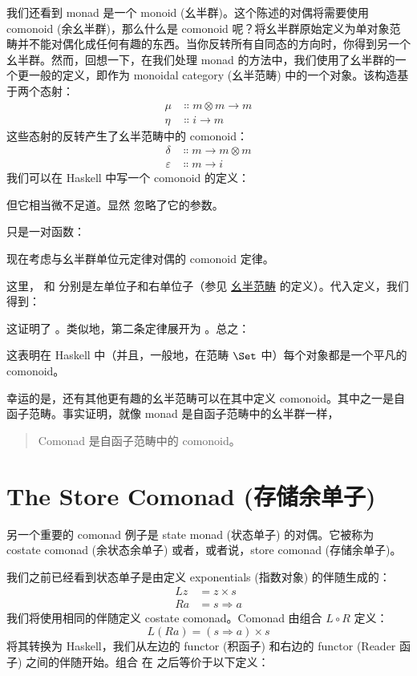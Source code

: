 我们还看到 monad 是一个 monoid (幺半群)。这个陈述的对偶将需要使用 comonoid (余幺半群)，那么什么是 comonoid 呢？将幺半群原始定义为单对象范畴并不能对偶化成任何有趣的东西。当你反转所有自同态的方向时，你得到另一个幺半群。然而，回想一下，在我们处理 monad 的方法中，我们使用了幺半群的一个更一般的定义，即作为 monoidal category (幺半范畴) 中的一个对象。该构造基于两个态射：
\begin{align*}
  \mu  & \Colon m \otimes m \to m \\
  \eta & \Colon i \to m
\end{align*}
这些态射的反转产生了幺半范畴中的 comonoid：
\begin{align*}
  \delta      & \Colon m \to m \otimes m \\
  \varepsilon & \Colon m \to i
\end{align*}
我们可以在 Haskell 中写一个 comonoid 的定义：

但它相当微不足道。显然  忽略了它的参数。

 只是一对函数：

现在考虑与幺半群单位元定律对偶的 comonoid 定律。

这里， 和  分别是左单位子和右单位子（参见 \hyperref[monads-categorically]{幺半范畴} 的定义）。代入定义，我们得到：

这证明了 。类似地，第二条定律展开为 。总之：

这表明在 Haskell 中（并且，一般地，在范畴 $\Set$ 中）每个对象都是一个平凡的 comonoid。

幸运的是，还有其他更有趣的幺半范畴可以在其中定义 comonoid。其中之一是自函子范畴。事实证明，就像 monad 是自函子范畴中的幺半群一样，

\begin{quote}
  Comonad 是自函子范畴中的 comonoid。
\end{quote}

\section{The Store Comonad (存储余单子)}

另一个重要的 comonad 例子是 state monad (状态单子) 的对偶。它被称为 costate comonad (余状态余单子) 或者，或者说，store comonad (存储余单子)。

我们之前已经看到状态单子是由定义 exponentials (指数对象) 的伴随生成的：
\begin{align*}
  L z & = z\times{}s      \\
  R a & = s \Rightarrow a
\end{align*}
我们将使用相同的伴随定义 costate comonad。Comonad 由组合 $L \circ R$ 定义：
\[L (R a) = (s \Rightarrow a)\times{}s\]
将其转换为 Haskell，我们从左边的  functor (积函子) 和右边的  functor (Reader 函子) 之间的伴随开始。组合  在  之后等价于以下定义：

